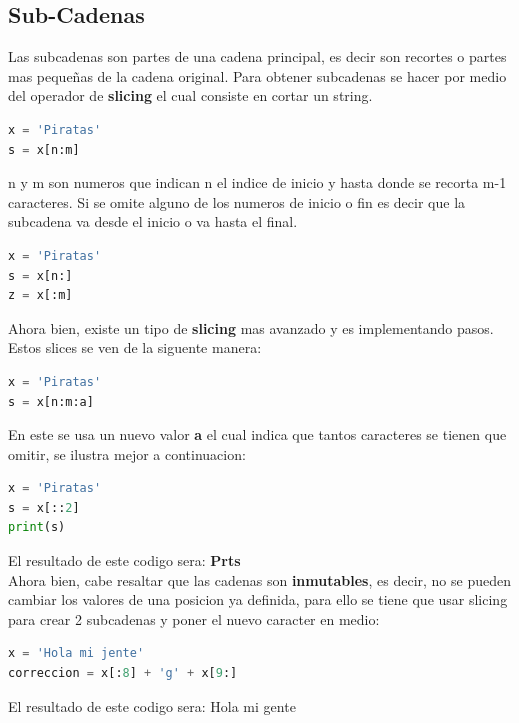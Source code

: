 \documentclass{article}
\begin{document}
\subsection{Sub-Cadenas}
Las subcadenas son partes de una cadena principal, es decir son recortes o partes mas pequeñas de la cadena original. Para obtener subcadenas se hacer por medio del operador de \textbf{slicing} el cual consiste en cortar un string.
\begin{lstlisting}[language=Python, caption=Slicing String 1 ]
x = 'Piratas'
s = x[n:m]
\end{lstlisting}
n y m son numeros que indican n el indice de inicio y hasta donde se recorta m-1 caracteres. Si se omite alguno de los numeros de inicio o fin es decir que la subcadena va desde el inicio o va hasta el final.
\begin{lstlisting}[language=Python, caption=Slicing String 2 ]
x = 'Piratas'
s = x[n:]
z = x[:m]
\end{lstlisting}
Ahora bien, existe un tipo de \textbf{slicing} mas avanzado y es implementando pasos. Estos slices se ven de la siguente manera:
\begin{lstlisting}[language=Python, caption=Slicing String 3 ]
x = 'Piratas'
s = x[n:m:a]
\end{lstlisting}
En este se usa un nuevo valor \textbf{a} el cual indica que tantos caracteres se tienen que omitir, se ilustra mejor a continuacion:
\begin{lstlisting}[language=Python, caption=Slicing String 4 ]
x = 'Piratas'
s = x[::2]
print(s)
\end{lstlisting}
El resultado de este codigo sera: \textbf{Prts}\\
Ahora bien, cabe resaltar que las cadenas son \textbf{inmutables}, es decir, no se pueden cambiar los valores de una posicion ya definida, para ello se tiene que usar slicing para crear 2 subcadenas y poner el nuevo caracter en medio:
\begin{lstlisting}[language=Python, caption=Inmutabilidad]
x = 'Hola mi jente'
correccion = x[:8] + 'g' + x[9:]
\end{lstlisting}
El resultado de este codigo sera: Hola mi gente
\end{document}
